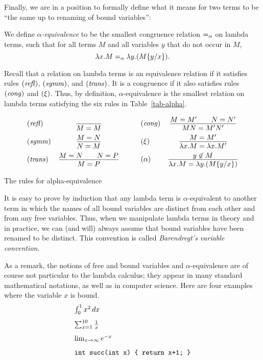 \documentclass{article}
\begin{document}
Finally, we are in a position to formally define what it means for two
terms to be ``the same up to renaming of bound variables'':

\begin{definition}
  We define {\em $\alpha$-equivalence} to be the smallest congruence
  relation $=_{\alpha}$ on lambda terms, such that for all terms $M$ and all
  variables $y$ that do not occur in $M$,
  \[ \lambda x.M =_{\alpha} \lambda y.(M\{y/x\}). \]
\end{definition}

Recall that a relation on lambda terms is an equivalence relation if
it satisfies rules $\textrm{(\textit{refl\/})}$, $\textrm{(\textit{symm\/})}$, and
$\textrm{(\textit{trans\/})}$. It is a congruence if it also satisfies rules
$\textrm{(\textit{cong\/})}$ and $\textrm{(\textit{$\xi$\/})}$.  Thus, by definition,
$\alpha$-equivalence is the smallest relation on lambda terms
satisfying the six rules in Table~\ref{tab-alpha}.
\begin{table*}[tbp]
\[ \begin{array}{lc}
  \trule{refl} &
  \deriv{}{M=M} \nl
  \trule{symm} &
  \deriv{M=N}{N=M} \nl
  \trule{trans} &
  \deriv{M=N\sep N=P}{M=P}
\end{array} \sep
\begin{array}{lc}
  \trule{cong} &
  \deriv{M=M'\sep N=N'}{MN=M'N'} \nl
  \nrule{\xi} &
  \deriv{M=M'}{\lam x.M=\lam x.M'} \nl
  \nrule{\alpha} &
  \deriv{\mbox{$y\not\in M$}}{\lam x.M = \lam y.(\ren{M}{y}{x})}
\end{array}
\]
\caption{The rules for alpha-equivalence}
\label{tab-alpha}
\end{table*}

It is easy to prove by induction that any lambda term is
$\alpha$-equivalent to another term in which the names of all bound
variables are distinct from each other and from any free variables.
Thus, when we manipulate lambda terms in theory and in practice, we
can (and will) always assume {\wloss} that bound variables have been
renamed to be distinct. This convention is called {\em Barendregt's
  variable convention}.

As a remark, the notions of free and bound variables and
$\alpha$-equivalence are of course not particular to the lambda
calculus; they appear in many standard mathematical notations, as well
as in computer science. Here are four examples where the variable $x$
is bound.
\[ \begin{array}{l}
  \int_0^1 x^2\,dx \nl
  \sum_{x=1}^{10}\frac{1}{x} \nl
  \lim_{x\to\infty} e^{-x} \nl
  \verb!int succ(int x) { return x+1; }!
\end{array}
\]
\end{document}
